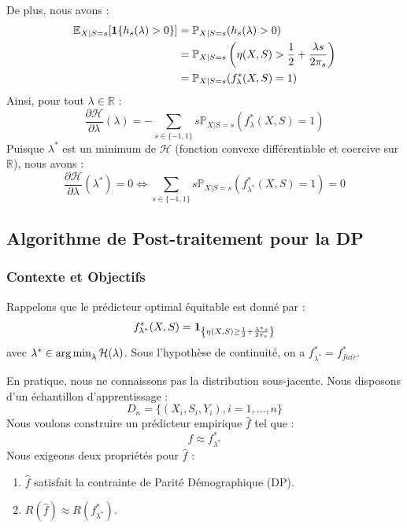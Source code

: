 De plus, nous avons :
\begin{align*}
    \mathbb{E}_{X|S=s}[\mathbf{1}\{h_s(\lambda) > 0\}] &= \mathbb{P}_{X|S=s}(h_s(\lambda) > 0) \\
    &= \mathbb{P}_{X|S=s}\left(\eta(X,S) > \frac{1}{2} + \frac{\lambda s}{2\pi_s}\right) \\
    &= \mathbb{P}_{X|S=s}(f^*_{\lambda}(X,S) = 1)
\end{align*}
Ainsi, pour tout $\lambda \in \mathbb{R}$ :
\begin{equation}
    \frac{\partial \mathcal{H}}{\partial \lambda}(\lambda) = - \sum_{s \in \{-1, 1\}} s \mathbb{P}_{X|S=s}(f^*_{\lambda}(X,S)=1)
\end{equation}
Puisque $\lambda^*$ est un minimum de $\mathcal{H}$ (fonction convexe différentiable et coercive sur $\mathbb{R}$), nous avons :
\begin{equation}
    \frac{\partial \mathcal{H}}{\partial \lambda}(\lambda^*) = 0 \iff \sum_{s \in \{-1, 1\}} s \mathbb{P}_{X|S=s}(f^*_{\lambda^*}(X,S)=1) = 0
\end{equation}

\subsection{Algorithme de Post-traitement pour la DP}

\subsubsection{Contexte et Objectifs}

Rappelons que le prédicteur optimal équitable est donné par :
\[
f^*_{\lambda^*}(X,S) = \mathbf{1}_{\left\{\eta(X,S) \ge \frac{1}{2} + \frac{\lambda^* s}{2\pi_s}\right\}}
\]
avec $\lambda^* \in \operatorname*{arg\,min}_{\lambda} \mathcal{H}(\lambda)$. Sous l'hypothèse de continuité, on a $f^*_{\lambda^*} = f^*_{fair}$.

En pratique, nous ne connaissons pas la distribution sous-jacente. Nous disposons d'un échantillon d'apprentissage :
\[
D_n = \{(X_i, S_i, Y_i), i=1, \dots, n\}
\]
Nous voulons construire un prédicteur empirique $\hat{f}$ tel que :
\[
\hat{f} \approx f^*_{\lambda^*}
\]
Nous exigeons deux propriétés pour $\hat{f}$ :
\begin{enumerate}
    \item $\hat{f}$ satisfait la contrainte de Parité Démographique (DP).
    \item $R(\hat{f}) \approx R(f^*_{\lambda^*})$.
\end{enumerate}

